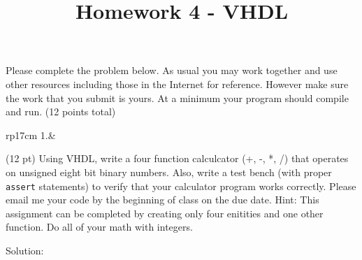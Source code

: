 \documentclass{article}
\title{Homework 4 - VHDL}
\date{}
\begin{document}
\maketitle
Please complete the problem below.  As usual you may work together and use other resources including those in the Internet for reference.  However make sure the work that you submit is yours.  At a minimum your program should compile and run. (12 points total)
\begin{longtable}[l]{rp{17cm}}
1.&\begin{minipage}[t]{\linewidth}(12 pt) Using VHDL, write a four function calculcator (+, -, *, /) that operates on unsigned eight bit binary numbers.  Also, write a test bench (with proper \texttt{assert} statements) to verify that your calculator program works correctly.  Please email me your code by the beginning of class on the due date.  Hint: This assignment can be completed by creating only four enitities and one other function.  Do all of your math with integers.

Solution: \\ \\


\end{minipage}\\
\medskip
\end{longtable}
\end{document}

